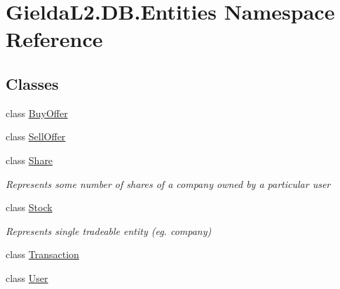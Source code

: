 \hypertarget{namespace_gielda_l2_1_1_d_b_1_1_entities}{}\section{Gielda\+L2.\+D\+B.\+Entities Namespace Reference}
\label{namespace_gielda_l2_1_1_d_b_1_1_entities}
\subsection*{Classes}
\begin{DoxyCompactItemize}
\item 
class \mbox{\hyperlink{class_gielda_l2_1_1_d_b_1_1_entities_1_1_buy_offer}{Buy\+Offer}}
\item 
class \mbox{\hyperlink{class_gielda_l2_1_1_d_b_1_1_entities_1_1_sell_offer}{Sell\+Offer}}
\item 
class \mbox{\hyperlink{class_gielda_l2_1_1_d_b_1_1_entities_1_1_share}{Share}}
\begin{DoxyCompactList}\small\item\em Represents some number of shares of a company owned by a particular user \end{DoxyCompactList}\item 
class \mbox{\hyperlink{class_gielda_l2_1_1_d_b_1_1_entities_1_1_stock}{Stock}}
\begin{DoxyCompactList}\small\item\em Represents single tradeable entity (eg. company) \end{DoxyCompactList}\item 
class \mbox{\hyperlink{class_gielda_l2_1_1_d_b_1_1_entities_1_1_transaction}{Transaction}}
\item 
class \mbox{\hyperlink{class_gielda_l2_1_1_d_b_1_1_entities_1_1_user}{User}}
\end{DoxyCompactItemize}
